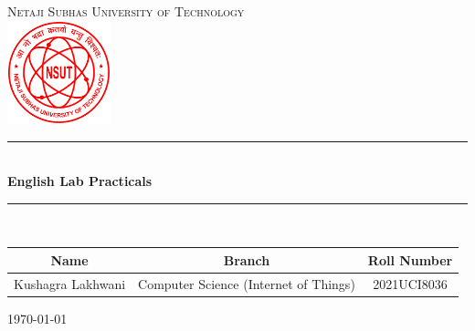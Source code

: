 \documentclass{article}
\begin{document}
\begin{titlepage}

  \newcommand{\HRule}{\rule{\linewidth}{0.5mm}}

  \center
  \textsc{\LARGE Netaji Subhas University of Technology}\\[1.5cm]

  \includegraphics[width=30mm]{NSUT.png}\\[1.0cm]

  \HRule \\[0.7cm]
  { \huge \bfseries English Lab Practicals}\\[0.4cm]
  \HRule \\[3cm]



  \begin{table}[H]
    \centering
    \begin{tabular}{ccc}
      Name              & Branch                                & Roll Number \\
      \hline
      Kushagra Lakhwani & Computer Science (Internet of Things) & 2021UCI8036 \\
    \end{tabular}
  \end{table}


  \vfill
  {\large \today}



\end{titlepage}

\newpage

\tableofcontents

\pagebreak


\newpage



\begingroup
\renewcommand{\section}[2]{}
\begin{thebibliography}{10}

  \bigskip


\end{thebibliography}
\endgroup
\end{document}
